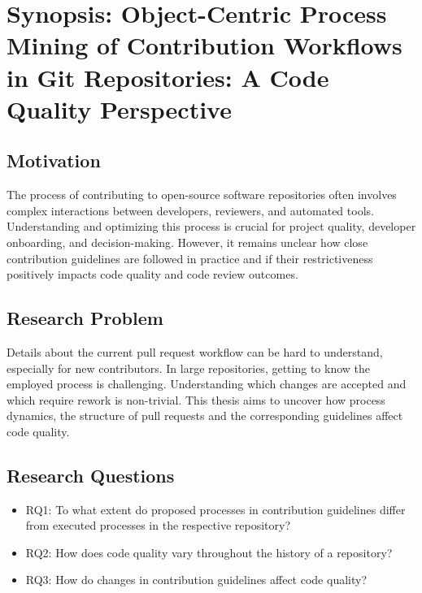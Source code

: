 \chapter*{Synopsis: Object-Centric Process Mining of Contribution Workflows in Git Repositories: A Code Quality Perspective}
\label{chap:synopsis}

\section*{Motivation}
The process of contributing to open-source software repositories often involves complex interactions between developers, reviewers, and automated tools. Understanding and optimizing this process is crucial for project quality, developer onboarding, and decision-making. However, it remains unclear how close contribution guidelines are followed in practice and if their restrictiveness positively impacts code quality and code review outcomes.

\section*{Research Problem}
Details about the current pull request workflow can be hard to understand, especially for new contributors. In large repositories, getting to know the employed process is challenging. Understanding which changes are accepted and which require rework is non-trivial. This thesis aims to uncover how process dynamics, the structure of pull requests and the corresponding guidelines affect code quality.

\section*{Research Questions}
\begin{itemize}[noitemsep]
    \item RQ1: To what extent do proposed processes in contribution guidelines differ from executed processes in the respective repository?
    \item RQ2: How does code quality vary throughout the history of a repository?
    \item RQ3: How do changes in contribution guidelines affect code quality?
\end{itemize}


